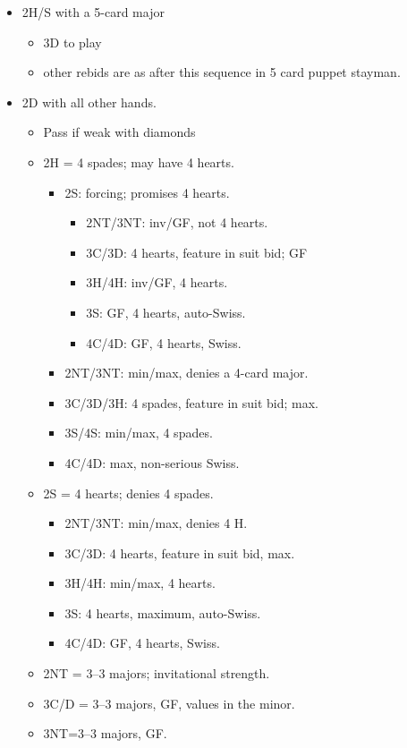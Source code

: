 \documentclass[a4paper,12pt]{article}
\begin{document}
	\begin{itemize}
	\item 2H/S with a 5-card major
		\begin{itemize}
		\item 3D to play
		\item other rebids are as after this sequence in 5 card puppet stayman.
		\end{itemize}
	\item 2D with all other hands. 
		\begin{itemize}
		\item Pass if weak with diamonds
		\item 2H = 4 spades; may have 4 hearts.
			\begin{itemize}
			\item 2S: forcing; promises 4 hearts.
				\begin{itemize}
				\item 2NT/3NT: inv/GF, not 4 hearts.
				\item 3C/3D: 4 hearts, feature in suit bid; GF
				\item 3H/4H: inv/GF, 4 hearts.
				\item 3S: GF, 4 hearts, auto-Swiss.
				\item 4C/4D: GF, 4 hearts, Swiss.
				\end{itemize}
			\item 2NT/3NT: min/max, denies a 4-card major.
			\item 3C/3D/3H: 4 spades, feature in suit bid; max.
			\item 3S/4S: min/max, 4 spades.
			\item 4C/4D: max, non-serious Swiss.
			\end{itemize}

		\item 2S = 4 hearts; denies 4 spades.
			\begin{itemize}
			\item 2NT/3NT: min/max, denies 4 H.
			\item 3C/3D: 4 hearts, feature in suit bid, max.
			\item 3H/4H: min/max, 4 hearts.
			\item 3S: 4 hearts, maximum, auto-Swiss.
			\item 4C/4D: GF, 4 hearts, Swiss.
			\end{itemize}

		\item 2NT = 3--3 majors; invitational strength.
		\item 3C/D = 3--3 majors, GF, values in the minor.
		\item 3NT=3--3 majors, GF.
		\end{itemize}
	\end{itemize}
\end{document}
